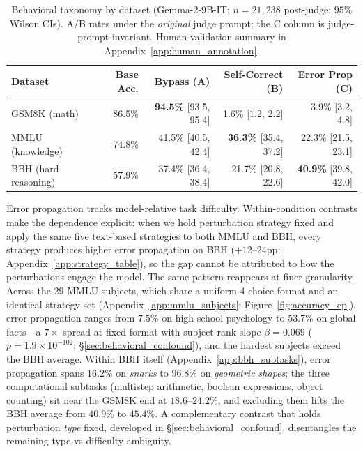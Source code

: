 \documentclass[10pt]{article} %
\begin{document}
\begin{table}[t]
\caption{Behavioral taxonomy by dataset (Gemma-2-9B-IT; $n = 21{,}238$ post-judge; $95\%$ Wilson CIs). A/B rates under the \emph{original} judge prompt; the C column is judge-prompt-invariant. Human-validation summary in Appendix~\ref{app:human_annotation}.}
\label{tab:by_dataset}
\begin{center}
\scriptsize
\begin{tabular}{lrrrr}
\toprule
\textbf{Dataset} & \textbf{Base Acc.} & \textbf{Bypass (A)} & \textbf{Self-Correct (B)} & \textbf{Error Prop (C)} \\
\midrule
GSM8K (math) & 86.5\% & \textbf{94.5\%} {\scriptsize [93.5, 95.4]} & 1.6\% {\scriptsize [1.2, 2.2]} & 3.9\% {\scriptsize [3.2, 4.8]} \\
MMLU (knowledge) & 74.8\% & 41.5\% {\scriptsize [40.5, 42.4]} & \textbf{36.3\%} {\scriptsize [35.4, 37.2]} & 22.3\% {\scriptsize [21.5, 23.1]} \\
BBH (hard reasoning) & 57.9\% & 37.4\% {\scriptsize [36.4, 38.4]} & 21.7\% {\scriptsize [20.8, 22.6]} & \textbf{40.9\%} {\scriptsize [39.8, 42.0]} \\
\bottomrule
\end{tabular}
\end{center}
\vspace{-1em}
\end{table}

Error propagation tracks model-relative task difficulty. Within-condition contrasts make the dependence explicit: when we hold perturbation strategy fixed and apply the same five text-based strategies to both MMLU and BBH, every strategy produces higher error propagation on BBH ($+12$--$24$pp; Appendix~\ref{app:strategy_table}), so the gap cannot be attributed to how the perturbations engage the model. The same pattern reappears at finer granularity. Across the 29 MMLU subjects, which share a uniform 4-choice format and an identical strategy set (Appendix~\ref{app:mmlu_subjects}; Figure~\ref{fig:accuracy_ep}), error propagation ranges from $7.5\%$ on high-school psychology to $53.7\%$ on global facts---a $7\times$ spread at fixed format with subject-rank slope $\beta = 0.069$ ($p = 1.9 \times 10^{-102}$; \S\ref{sec:behavioral_confound}), and the hardest subjects exceed the BBH average. Within BBH itself (Appendix~\ref{app:bbh_subtasks}), error propagation spans $16.2\%$ on \emph{snarks} to $96.8\%$ on \emph{geometric shapes}; the three computational subtasks (multistep arithmetic, boolean expressions, object counting) sit near the GSM8K end at $18.6$--$24.2\%$, and excluding them lifts the BBH average from $40.9\%$ to $45.4\%$. A complementary contrast that holds perturbation \emph{type} fixed, developed in \S\ref{sec:behavioral_confound}, disentangles the remaining type-vs-difficulty ambiguity.
\end{document}
